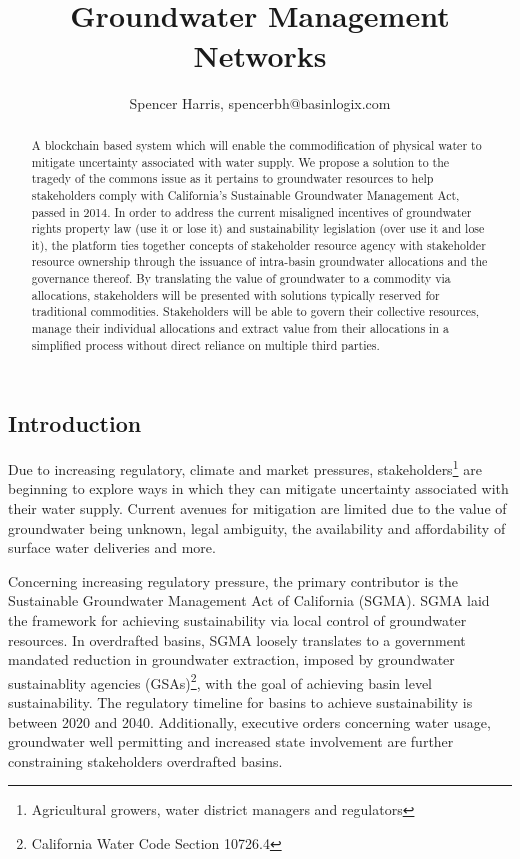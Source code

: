 \documentclass{tufte-handout}
\title[{}]{
 \\
\large Groundwater Management Networks}
\author[Spencer Harris, spencerbh@basinlogix.com]{{\scriptsize Spencer Harris, spencerbh@basinlogix.com}}
\begin{document}
\maketitle%
\begin{fullwidth}
\begin{abstract}
\noindent A blockchain based system which will enable the commodification of physical water to mitigate uncertainty associated with water supply. We propose a solution to the tragedy of the commons issue as it pertains to groundwater resources to help stakeholders comply with California's Sustainable Groundwater Management Act, passed in 2014. In order to address the current misaligned incentives of groundwater rights property law (use it or lose it) and sustainability legislation (over use it and lose it), the platform ties together concepts of stakeholder resource agency with stakeholder resource ownership through the issuance of intra-basin groundwater allocations and the governance thereof. By translating the value of groundwater to a commodity via allocations, stakeholders will be presented with solutions typically reserved for traditional commodities. Stakeholders will be able to govern their collective resources, manage their individual allocations and extract value from their allocations in a simplified process without direct reliance on multiple third parties. 
\end{abstract}
\end{fullwidth}

\subsection{Introduction}\label{sec:headings}

Due to increasing regulatory, climate and market pressures, stakeholders\footnote{Agricultural growers, water district managers and regulators} are beginning to explore ways in which they can mitigate uncertainty associated with their water supply. Current avenues for mitigation are limited due to the value of groundwater being unknown, legal ambiguity, the availability and affordability of surface water deliveries and more. 

Concerning increasing regulatory pressure, the primary contributor is the Sustainable Groundwater Management Act of California (SGMA)\cite{SGMA}. SGMA laid the framework for achieving sustainability via local control of groundwater resources. In overdrafted basins, SGMA loosely translates to a government mandated reduction in groundwater extraction, imposed by groundwater sustainablity agencies (GSAs)\footnote{California Water Code Section 10726.4}, with the goal of achieving basin level sustainability. The regulatory timeline for basins to achieve sustainability is between 2020 and 2040. Additionally, executive orders\cite{execorder} concerning water usage, groundwater well permitting and increased state involvement are further constraining stakeholders overdrafted basins.
\end{document}
